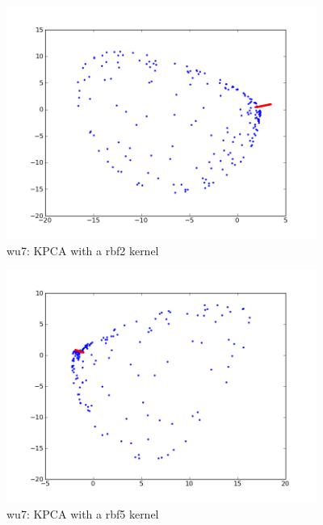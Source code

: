 \begin{figure}[here]
	\center
	\caption{wu7: KPCA with a rbf2 kernel}
	\label{fig:wu7_rbf2}
	\includegraphics[width=4.0in]{img/wu7_rbf2.png}
\end{figure}

\begin{figure}[here]
	\center
	\caption{wu7: KPCA with a rbf5 kernel}
	\label{fig:wu7_rbf5}
	\includegraphics[width=4.0in]{img/wu7_rbf5.png}
\end{figure}